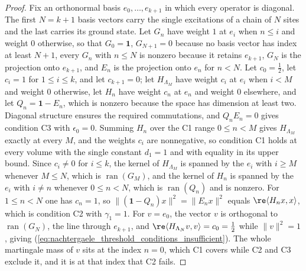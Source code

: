\begin{proof}
    \leanok
    Fix an orthonormal basis $e_0,\ldots,e_{k+1}$ in which every operator is
    diagonal. The first $N=k+1$ basis vectors carry the single
    excitations of a chain of $N$ sites and the last carries its ground state.
    Let $G_n$ have weight $1$ at $e_i$ when $n\leq i$ and weight $0$
    otherwise, so that $G_0=\mathbf 1$, $G_{N+1}=0$ because no basis vector
    has index at least $N+1$, every $G_n$ with $n\leq N$ is nonzero
    because it retains $e_{k+1}$, $G_N$ is the projection onto $e_{k+1}$, and
    $E_n$ is the projection onto $e_n$ for $n<N$. Let $c_0=\tfrac12$, let
    $c_i=1$ for $1\leq i\leq k$, and let $c_{k+1}=0$; let $H_{\Lambda_M}$ have
    weight $c_i$ at $e_i$ when $i<M$ and weight $0$ otherwise, let $H_n$ have
    weight $c_n$ at $e_n$ and weight $0$
    elsewhere, and let $Q_n=\mathbf 1-E_n$, which is nonzero because the space
    has dimension at least two. Diagonal structure ensures the required
    commutations, and $Q_nE_n=0$ gives condition C3 with $\epsilon_0=0$.
    Summing $H_n$ over the C1 range $0\leq n<M$ gives $H_{\Lambda_M}$ exactly
    at every $M$, and the weights $c_i$ are nonnegative, so condition C1 holds
    at every volume with the single constant $d_1=1$ and with equality in its
    upper bound. Since $c_i\neq0$ for $i\leq k$, the kernel of
    $H_{\Lambda_M}$ is spanned by the $e_i$ with $i\geq M$ whenever $M\leq N$,
    which is $\operatorname{ran}(G_M)$, and the kernel of $H_n$ is spanned by
    the $e_i$ with $i\neq n$ whenever $0\leq n<N$, which is
    $\operatorname{ran}(Q_n)$ and is nonzero. For $1\leq n<N$ one has $c_n=1$,
    so
    $\lVert(\mathbf 1-Q_n)x\rVert^2=\lVert E_nx\rVert^2$ equals
    $\re\langle H_nx,x\rangle$, which is condition C2 with $\gamma_1=1$.
    For $v=e_0$, the vector $v$ is orthogonal to $\operatorname{ran}(G_N)$, the line through
    $e_{k+1}$, and $\re\langle H_{\Lambda_N}v,v\rangle=c_0=\tfrac12$ while
    $\lVert v\rVert^2=1$, giving
    (\ref{eq:nachtergaele_threshold_conditions_insufficient}). The whole
    martingale mass of $v$ sits at the index $n=0$, which C1 covers while C2
    and C3 exclude it, and it is at that index that C2 fails.
\end{proof}

